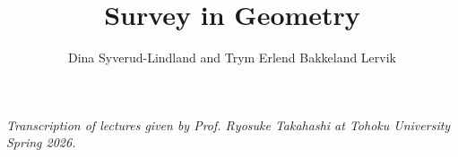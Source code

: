 \documentclass[10pt]{article}
\title{Survey in Geometry}
\author{Dina Syverud-Lindland and Trym Erlend Bakkeland Lervik}
\date{}
\begin{document}

\maketitle
\noindent \textit{Transcription of lectures given by Prof. Ryosuke Takahashi at Tohoku University Spring 2026.}
\newpage
\tableofcontents
\newpage













\end{document}
